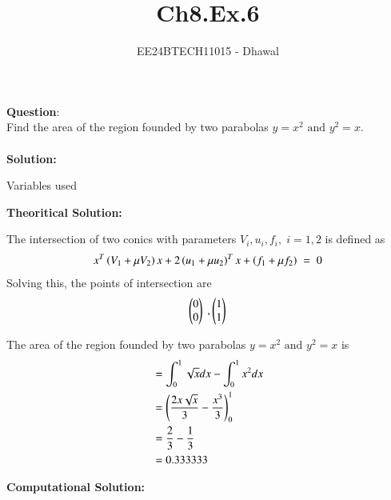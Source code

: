 \documentclass[journal]{IEEEtran}
\begin{document}

\vspace{3cm}

\title{Ch8.Ex.6}
\author{EE24BTECH11015 - Dhawal}
 \maketitle
{\let\newpage\relax\maketitle}

\renewcommand{\thefigure}{\theenumi}
\renewcommand{\thetable}{\theenumi}
\setlength{\intextsep}{10pt} %


\renewcommand{\thetable}{\theenumi}

\textbf{Question}:\\
Find the area of the region founded by two parabolas $y=x^2 \text{ and } y^2=x $.
\\ \\
\textbf{Solution:}\\
\begin{table}[H]
    \centering
    
    \caption{Variables used}
    \label{tab1-1.2-20}
\end{table} 
\textbf{Theoritical Solution: }

The intersection of two conics with parameters $V_i,u_i,f_i,\;i= 1,2$ is defined as
\begin{align}
x^T\left(V_1+\mu V_2\right)x+2\left(u_1+\mu u_2\right)^T x + \left(f_1+\mu f_2\right)\;=\;0
\end{align}
Solving this, the points of intersection are
\begin{align}
\begin{pmatrix}0\\0\end{pmatrix}\;,\begin{pmatrix}1\\1\end{pmatrix}
\end{align}

The area of the region founded by two parabolas $y=x^2 \text{ and } y^2=x $ is
\begin{align}
    &=\int_{0}^{1} \sqrt{x}dx-\int_{0}^{1}  x^2 dx\\
    &=\left(\frac{2x\sqrt{x}}{3}-\frac{x^3}{3}\right)_{0}^{1}\\
    &=\frac{2}{3}-\frac{1}{3}\\
    &=0.333333
\end{align}

\textbf{Computational Solution:}\\
\end{document}
